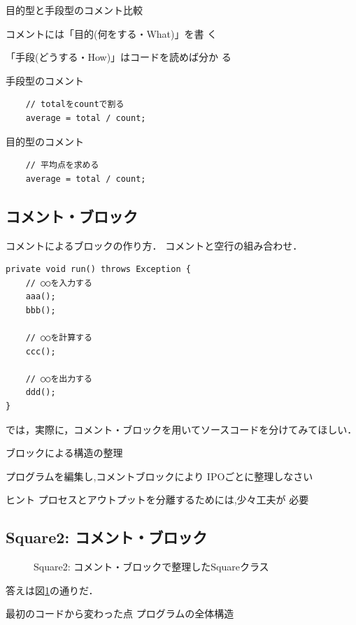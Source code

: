 \documentclass[a4j, twoside]{jsbook}
\begin{document}
目的型と手段型のコメント比較

コメントには「目的(何をする・What)」を書
く

「手段(どうする・How)」はコードを読めば分か
る

手段型のコメント
\begin{verbatim}
	// totalをcountで割る
	average = total / count;
\end{verbatim}

目的型のコメント
\begin{verbatim}
	// 平均点を求める
	average = total / count;
\end{verbatim}

\subsection{コメント・ブロック}

コメントによるブロックの作り方．
コメントと空行の組み合わせ．

\begin{verbatim}
private void run() throws Exception {
    // ○○を入力する
    aaa();
    bbb();

    // ○○を計算する
    ccc();

    // ○○を出力する
    ddd();
}
\end{verbatim}

では，実際に，コメント・ブロックを用いてソースコードを分けてみてほしい．

\begin{例題}
ブロックによる構造の整理 

プログラムを編集し,コメントブロックにより
IPOごとに整理しなさい
\end{例題}

 ヒント プロセスとアウトプットを分離するためには,少々工夫が
必要




\subsection{Square2: コメント・ブロック}

\begin{figure}
 
 \caption{Square2: コメント・ブロックで整理したSquareクラス}\label{fig:Square2:Square}
\end{figure}

答えは図\ref{fig:Square2:Square}の通りだ．

最初のコードから変わった点
プログラムの全体構造
\end{document}

